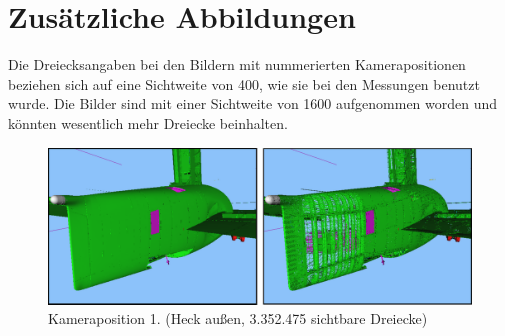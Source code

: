 %
%
%
%
%
%
%
%
%

\chapter{Zusätzliche Abbildungen}
\label{chap:add_fig}
Die Dreiecksangaben bei den Bildern mit nummerierten Kamerapositionen beziehen sich auf eine Sichtweite von 400, wie sie bei den Messungen benutzt wurde. Die Bilder sind mit einer Sichtweite von 1600 aufgenommen worden und könnten wesentlich mehr Dreiecke beinhalten.
\begin{figure}
 \centering
\includegraphics[scale=0.40]{images/pos1.pdf}
\caption{\label{fig:eval:pos1}Kameraposition 1. (Heck außen, 3.352.475 sichtbare Dreiecke)}
\end{figure}
\vspace{1.5cm}

